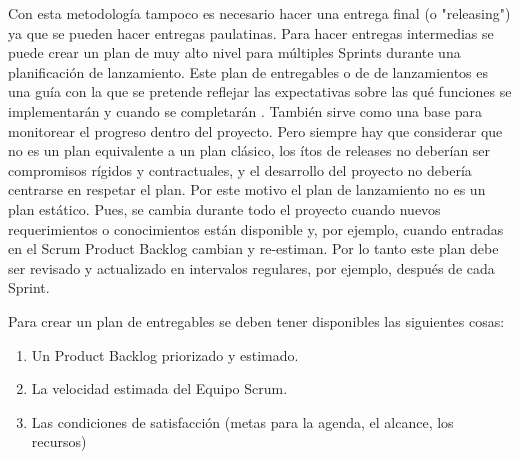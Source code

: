Con esta metodología tampoco es necesario hacer una entrega final (o "releasing") ya que se pueden hacer entregas paulatinas. Para hacer entregas intermedias se puede crear un plan de muy alto nivel para múltiples Sprints durante una planificación de lanzamiento. Este plan de entregables o de de lanzamientos es una guía con la que se pretende reflejar las expectativas sobre las qué funciones se implementarán y cuando se completarán \cite{Scrum-Institute-2015}. También sirve como una base para monitorear el progreso dentro del proyecto. Pero siempre hay que considerar que no es un plan equivalente a un plan clásico, los ítos de releases no deberían ser compromisos rígidos y contractuales, y el desarrollo del proyecto no debería centrarse en respetar el plan. Por este motivo el plan de lanzamiento no es un plan estático. Pues, se cambia durante todo el proyecto cuando nuevos requerimientos o conocimientos están disponible y, por ejemplo, cuando entradas en el Scrum Product Backlog cambian y re-estiman. Por lo tanto este plan debe ser revisado y actualizado en intervalos regulares, por ejemplo, después de cada Sprint.

Para crear un plan de entregables se deben tener disponibles las siguientes cosas:

\begin{enumerate}
\item Un Product Backlog priorizado y estimado.
\item La velocidad estimada del Equipo Scrum.
\item Las condiciones de satisfacción (metas para la agenda, el alcance, los recursos)
\end{enumerate}



